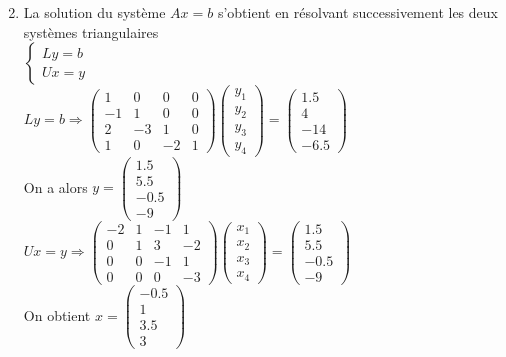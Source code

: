\documentclass[10pt]{article}
\begin{document}
\begin{enumerate}
  \setcounter{enumi}{1}
  \item La solution du système \(A x=b\) s'obtient en résolvant successivement les deux systèmes triangulaires\\
\(\left\{\begin{array}{l}L y=b \\ U x=y\end{array}\right.\)\\
\(L y=b \Rightarrow\left(\begin{array}{cccc}1 & 0 & 0 & 0 \\ -1 & 1 & 0 & 0 \\ 2 & -3 & 1 & 0 \\ 1 & 0 & -2 & 1\end{array}\right)\left(\begin{array}{l}y_{1} \\ y_{2} \\ y_{3} \\ y_{4}\end{array}\right)=\left(\begin{array}{c}1.5 \\ 4 \\ -14 \\ -6.5\end{array}\right)\)\\
On a alors \(y=\left(\begin{array}{c}1.5 \\ 5.5 \\ -0.5 \\ -9\end{array}\right)\)\\
\(U x=y \Rightarrow\left(\begin{array}{cccc}-2 & 1 & -1 & 1 \\ 0 & 1 & 3 & -2 \\ 0 & 0 & -1 & 1 \\ 0 & 0 & 0 & -3\end{array}\right)\left(\begin{array}{c}x_{1} \\ x_{2} \\ x_{3} \\ x_{4}\end{array}\right)=\left(\begin{array}{c}1.5 \\ 5.5 \\ -0.5 \\ -9\end{array}\right)\)\\
On obtient \(x=\left(\begin{array}{c}-0.5 \\ 1 \\ 3.5 \\ 3\end{array}\right)\)
\end{enumerate}
\end{document}
